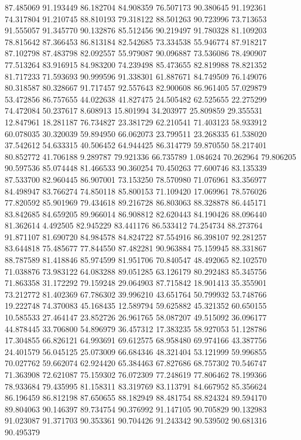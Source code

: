 87.485069
91.193449
86.182704
84.908359
76.507173
90.380645
91.192361
74.317804
91.210745
88.810193
79.318122
88.501263
90.723996
73.713653
91.555057
91.345770
90.132876
85.512456
90.219497
91.780328
81.109203
78.815642
87.366453
86.813184
82.542685
73.334538
55.946774
87.918217
87.102798
87.483798
82.092557
55.979087
90.096887
73.536086
78.490907
77.513264
83.916915
84.983200
74.239498
85.473655
82.819988
78.821352
81.717233
71.593693
90.999596
91.338301
61.887671
84.749509
76.149076
80.318587
80.328667
91.717457
92.557643
82.900608
86.961405
57.029879
53.472856
86.757655
44.022638
41.827475
24.505482
62.525655
22.275299
74.472084
50.237617
8.608913
15.801994
34.203977
25.809859
29.355531
12.847961
18.281187
76.734827
23.381729
62.210541
71.403123
58.933912
60.078035
30.320039
59.894950
66.062073
23.799511
23.268335
61.538020
37.542612
54.633315
40.506452
64.944425
86.314779
59.870550
58.217401
80.852772
41.706188
9.289787
79.921336
66.735789
1.084624
70.262964
79.806205
90.597536
85.074448
81.466533
90.360254
70.450263
77.600746
83.135339
87.533700
82.960445
86.907001
73.153250
78.570980
71.076961
83.356977
84.498947
83.766274
74.850118
85.800153
71.109420
17.069961
78.576026
77.820592
85.901969
79.434618
89.216728
86.803063
88.328878
86.445171
83.842685
84.659205
89.966014
86.908812
82.620443
84.190426
88.096440
81.362614
4.492505
82.945229
83.441176
86.533412
74.254734
88.273764
91.871107
81.690720
84.984578
84.824722
87.554916
86.398107
92.281257
83.644818
75.485677
77.844550
87.482281
90.963884
75.159945
88.331867
88.787589
81.418846
85.974599
81.951706
70.840547
48.492065
82.102570
71.038876
73.983122
64.083288
89.051285
63.126179
80.292483
85.345756
71.863358
31.172292
79.159248
29.064903
87.715842
18.901413
35.355901
73.212772
81.402369
67.786302
39.996210
43.651764
50.799932
53.748766
19.222748
74.370083
45.168435
12.589794
59.625882
45.321352
60.650155
10.585533
27.464147
23.852726
26.961765
58.087207
49.515092
36.096177
44.878445
33.706800
54.896979
36.457312
17.383235
58.927053
51.128786
17.304855
66.826121
64.993691
69.612575
68.958480
69.974166
43.387756
24.401579
56.045125
25.073009
66.684346
48.321404
53.121999
59.996855
70.027762
59.662074
62.924420
65.384463
67.827686
68.757302
70.546747
71.363908
72.621087
75.159302
76.072309
77.248619
77.806462
78.199366
78.933684
79.435995
81.158311
83.319769
83.113791
84.667952
85.356624
86.196459
86.812198
87.650655
88.182949
88.481754
88.824324
89.594170
89.804063
90.146397
89.734754
90.376992
91.147105
90.705829
90.132983
91.023087
91.371703
90.353361
90.704426
91.243342
90.539502
90.681316
90.495379
